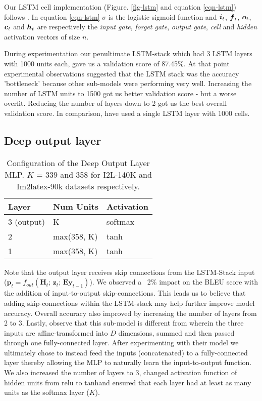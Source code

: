 Our LSTM cell implementation (Figure. \ref{fig-lstm} and equation \ref{eqn-lstm}) follows \citet{DBLP:journals/corr/abs-1303-5778, Zaremba2014RecurrentNN}.
In equation \ref{eqn-lstm} $\sigma$ is the logistic sigmoid function and $\boldsymbol{i}_{t} $, $\boldsymbol{f}_{t} $, $\boldsymbol{o}_{t} $, $\boldsymbol{c}_{t} $ and $\boldsymbol{h}_{t} $ are respectively the \emph{input gate}, \emph{forget gate}, \emph{output gate}, \emph{cell} and \emph{hidden} activation vectors of size $n$.

During experimentation our penultimate LSTM-stack which had 3 LSTM layers with 1000 units each, gave us a validation score of 87.45\%. At that point experimental observations suggested that the LSTM stack was the accuracy 'bottleneck' because other sub-models were performing very well. Increasing the number of LSTM units to 1500 got us better validation score - but a worse overfit. Reducing the number of layers down to 2 got us the best overall validation score. In comparison, \citet{Xu2015ShowAA} have used a single LSTM layer with 1000 cells.

\subsection{Deep output layer}
\label{output-comments}
\begin{wraptable}{r}{0.5\textwidth}
	\caption[Output Layer Configuration]{Configuration of the Deep Output Layer MLP. $K$ = 339 and 358 for I2L-140K and Im2latex-90k datasets respectively.}
	\begin{tabular}{lll}
		\textbf{Layer} & \textbf{Num Units} & \textbf{Activation}\\
		\hline
		3 (output) & K & softmax \\
		2 & max(358, K) & tanh \\
		1 & max(358, K) & tanh
	\end{tabular}
	\centering
	\label{table-output-layer}
\end{wraptable}
Note that the output layer receives skip connections from the LSTM-Stack input ($\boldsymbol{p}_t = f_{out}(\boldsymbol{H}_t; \, \boldsymbol{z}_t; \, \boldsymbol{Ey}_{t-1})$). We observed a ~2\% impact on the BLEU score with the addition of input-to-output skip-connections. This leads us to believe that adding skip-connections within the LSTM-stack may help further improve model accuracy. Overall accuracy also improved by increasing the number of layers from 2 to 3. Lastly, observe that this sub-model is different from \citet{Xu2015ShowAA} wherein the three inputs are affine-transformed into $D$ dimensions, summed and then passed through one fully-connected layer. After experimenting with their model we ultimately chose to instead feed the inputs (concatenated) to a fully-connected layer thereby allowing the MLP to naturally learn the input-to-output function. We also increased the number of layers to 3, changed activation function of hidden units from relu to tanh\footnotemark[101] and ensured that each layer had at least as many units as the softmax layer ($K$).
